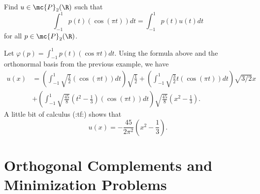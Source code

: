 \documentclass[math0540-lecture-notes.tex]{subfiles}
\begin{document}
\begin{example}
  Find $u\in \mc{P}_2(\R)$ such that \[
    \int_{-1}^1p(t)(\cos{(\pi t)})dt=\int_{-1}^1p(t)u(t)dt
  \] for all $p\in \mc{P}_2(\R)$.
\end{example}
\begin{solution}
  Let $\varphi(p)=\int_{-1}^1p(t)(\cos{\pi t})dt$. Using the formula above and the orthonormal basis
  from the previous example, we have
  \begin{align*}
    u(x)&= \left( \int_{-1}^1\sqrt{\frac{1}{2}}(\cos{(\pi t)})dt \right)\sqrt{\frac{1}{2}} +\left(
    \int_{-1}^1\sqrt{\frac{3}{2}}t(\cos{(\pi t)})dt \right) \sqrt{3/2}x \\
        &+\left( \int_{-1}^1\sqrt{\frac{45}{8}}(t^2-\frac{1}{3})(\cos{(\pi t)})dt \right)
        \sqrt{\frac{45}{8}}(x^2-\frac{1}{3})
  .\end{align*}
  A little bit of calculus (:tf:) shows that \[
    u(x)=-\frac{45}{2\pi^2}(x^2-\frac{1}{3})
  .\] 
\end{solution}


\section{Orthogonal Complements and Minimization Problems}
\end{document}
